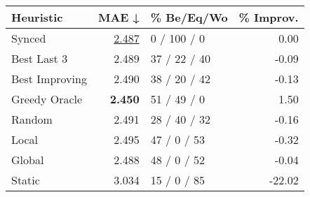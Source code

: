 \begin{tabular}{lrlr}
\toprule
\textbf{Heuristic} & \textbf{MAE ↓} & \textbf{\% Be/Eq/Wo} & \textbf{\% Improv.} \\
\midrule
            Synced &          \underline{2.487} &          0 / 100 / 0 &                0.00 \\
\midrule
       Best Last 3 &          2.489 &         37 / 22 / 40 &               -0.09 \\
    Best Improving &          2.490 &         38 / 20 / 42 &               -0.13 \\
\addlinespace
     Greedy Oracle &          \textbf{2.450} &          51 / 49 / 0 &                1.50 \\
            Random &          2.491 &         28 / 40 / 32 &               -0.16 \\
\midrule
             Local &          2.495 &          47 / 0 / 53 &               -0.32 \\
            Global &          2.488 &          48 / 0 / 52 &               -0.04 \\
\midrule
            Static &          3.034 &          15 / 0 / 85 &              -22.02 \\
\bottomrule
\end{tabular}

\label{tab:hr_iid_lr01_le2_bs4_Summary}
